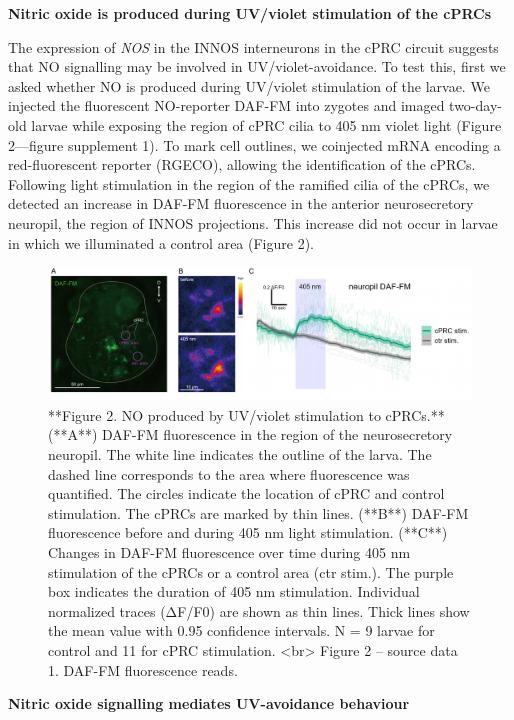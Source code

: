 \documentclass[
  10pt,
  onecolumn]{article}
\begin{document}
\textbf{Nitric oxide is produced during UV/violet stimulation of the
cPRCs}

The expression of \emph{NOS} in the INNOS interneurons in the cPRC
circuit suggests that NO signalling may be involved in
UV/violet-avoidance. To test this, first we asked whether NO is produced
during UV/violet stimulation of the larvae. We injected the fluorescent
NO-reporter DAF-FM into zygotes and imaged two-day-old larvae while
exposing the region of cPRC cilia to 405 nm violet light (Figure
2---figure supplement 1). To mark cell outlines, we coinjected mRNA
encoding a red-fluorescent reporter (RGECO), allowing the identification
of the cPRCs. Following light stimulation in the region of the ramified
cilia of the cPRCs, we detected an increase in DAF-FM fluorescence in
the anterior neurosecretory neuropil, the region of INNOS projections.
This increase did not occur in larvae in which we illuminated a control
area (Figure 2).

\begin{figure}
\includegraphics[width=41.67in]{figures/Fig2} \caption{**Figure 2. NO produced by UV/violet stimulation to cPRCs.** (**A**) DAF-FM fluorescence in the region of the neurosecretory neuropil. The white line indicates the outline of the larva. The dashed line corresponds to the area where fluorescence was quantified. The circles indicate the location of cPRC and control stimulation. The cPRCs are marked by thin lines. (**B**) DAF-FM fluorescence before and during 405 nm light stimulation. (**C**) Changes in DAF-FM fluorescence over time during 405 nm stimulation of the cPRCs or a control area (ctr stim.). The purple box indicates the duration of 405 nm stimulation. Individual normalized traces (ΔF/F0) are shown as thin lines. Thick lines show the mean value with 0.95 confidence intervals. N = 9 larvae for control and 11 for cPRC stimulation. <br> Figure 2 -- source data 1. DAF-FM fluorescence reads.}\label{fig:unnamed-chunk-2}
\end{figure}

\textbf{Nitric oxide signalling mediates UV-avoidance behaviour}
\end{document}
